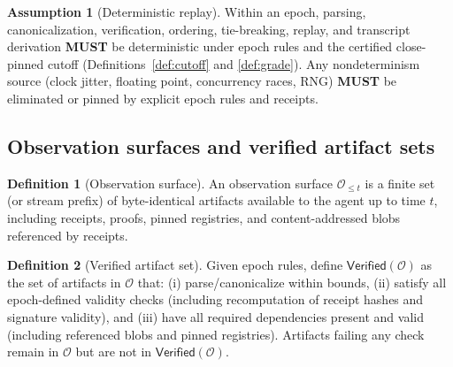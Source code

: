 \documentclass[11pt]{article}
\newcommand{\MUST}{\textbf{MUST}}
\newcommand{\1}{\mathbf{1}}
\theoremstyle{definition}
\newtheorem{definition}{Definition}
\newtheorem{assumption}{Assumption}
\theoremstyle{plain}
\begin{document}
\begin{assumption}[Deterministic replay]
\label{ass:det_replay}
Within an epoch, parsing, canonicalization, verification, ordering, tie-breaking, replay, and transcript derivation \MUST{} be deterministic under epoch rules and the certified close-pinned cutoff (Definitions~\ref{def:cutoff} and \ref{def:grade}). Any nondeterminism source (clock jitter, floating point, concurrency races, RNG) \MUST{} be eliminated or pinned by explicit epoch rules and receipts.
\end{assumption}

\subsection{Observation surfaces and verified artifact sets}

\begin{definition}[Observation surface]
\label{def:obs_surface}
An observation surface $\mathcal{O}_{\le t}$ is a finite set (or stream prefix) of byte-identical artifacts available to the agent up to time $t$, including receipts, proofs, pinned registries, and content-addressed blobs referenced by receipts.
\end{definition}

\begin{definition}[Verified artifact set]
\label{def:verified_set}
Given epoch rules, define $\mathsf{Verified}(\mathcal{O})$ as the set of artifacts in $\mathcal{O}$ that:
(i) parse/canonicalize within bounds,
(ii) satisfy all epoch-defined validity checks (including recomputation of receipt hashes and signature validity),
and (iii) have all required dependencies present and valid (including referenced blobs and pinned registries).
Artifacts failing any check remain in $\mathcal{O}$ but are not in $\mathsf{Verified}(\mathcal{O})$.
\end{definition}
\end{document}
